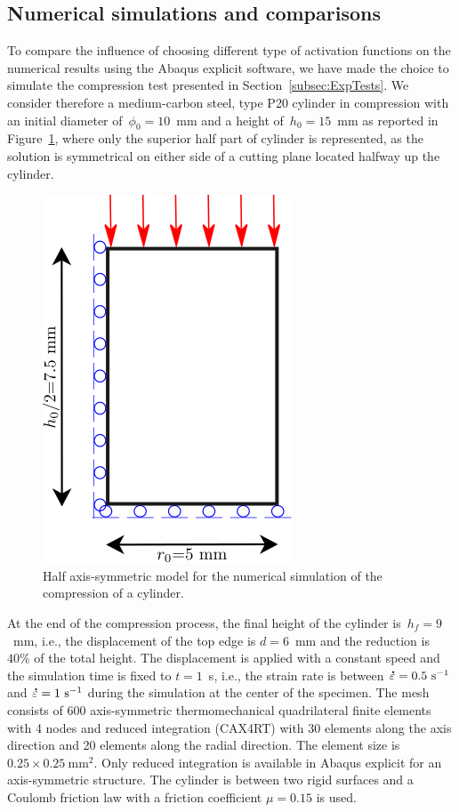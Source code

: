 \documentclass[algorithms,article,submit,pdftex,oneauthors]{Definitions/mdpi}
\makeatletter
\DeclareRobustCommand{\mdot}[1]{\accentset{\mbox{\bfseries .}}{#1}}
\DeclareRobustCommand{\ie}{i.e.,\@\xspace}
\DeclareRobustCommand{\ps}{\text{s}^{-1}}
\makeatother
\begin{document}
\subsection{Numerical simulations and comparisons}\label{subsec:Num-sim}

To compare the influence of choosing different type of activation functions on the numerical results using the Abaqus explicit software, we have made the choice to simulate the compression test presented in Section~\ref{subsec:ExpTests}.
We consider therefore a medium-carbon steel, type P20 cylinder in compression with an initial diameter of~$\phi_{0}=10$~mm and a height of~$h_{0}=15$~mm as reported in Figure~\ref{fig:Num-model}, where only the superior half part of cylinder is represented, as the solution is symmetrical on either side of a cutting plane located halfway up the cylinder.
\begin{figure}[h!]
\centering
\includegraphics[width=0.25\columnwidth]{Figures/CyCompression}
\caption{Half axis-symmetric model for the numerical simulation of the compression of a cylinder.}
\label{fig:Num-model}
\end{figure}
At the end of the compression process, the final height of the cylinder is~$h_f=9$~mm, \ie the displacement of the top edge is $d=6$~mm and the reduction is $40\%$ of the total height.
The displacement is applied with a constant speed and the simulation time is fixed to $t=1$~s, \ie the strain rate is between $\mdot{\varepsilon}=0.5~\ps$ and $\mdot{\varepsilon}=1~\ps$ during the simulation at the center of the specimen.
The mesh consists of $600$ axis-symmetric thermomechanical quadrilateral finite elements with 4 nodes and reduced integration (CAX4RT) with 30 elements along the axis direction and 20 elements along the radial direction.
The element size is $0.25\times0.25~\text{mm}^2$.
Only reduced integration is available in Abaqus explicit for an axis-symmetric structure.
The cylinder is between two rigid surfaces and a Coulomb friction law with a friction coefficient $\mu=0.15$ is used.
\end{document}
